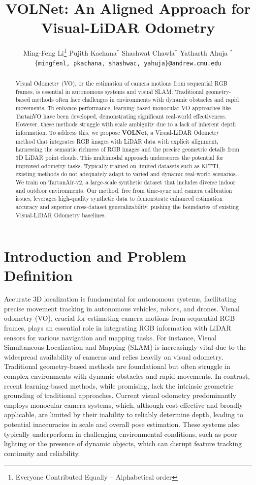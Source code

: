 \documentclass[11pt,a4paper]{article}
\title{VOLNet: An Aligned Approach for Visual-LiDAR Odometry}
\author{
  Ming-Feng Li\thanks{\hspace{4pt}Everyone Contributed Equally -- Alphabetical order} \hspace{2em} Pujith Kachana$^*$ \hspace{2em} Shashwat Chawla$^*$ \hspace{2em} Yatharth Ahuja $^*$ \\
  \texttt{\{mingfenl, pkachana, shashwac, yahuja\}@andrew.cmu.edu}
  }
\date{}
\begin{document}
\maketitle
\begin{abstract}
Visual Odometry (VO), or the estimation of camera motions from sequential RGB frames, is essential in autonomous systems and visual SLAM. Traditional geometry-based methods often face challenges in environments with dynamic obstacles and rapid movements. To enhance performance, learning-based monocular VO approaches like TartanVO have been developed, demonstrating significant real-world effectiveness. However, these methods struggle with scale ambiguity due to a lack of inherent depth information. To address this, we propose \textbf{VOLNet}, a Visual-LiDAR Odometry method that integrates RGB images with LiDAR data with explicit alignment, harnessing the semantic richness of RGB images and the precise geometric details from 3D LiDAR point clouds. This multimodal approach underscores the potential for improved odometry tasks. Typically trained on limited datasets such as KITTI, existing methods do not adequately adapt to varied and dynamic real-world scenarios. We train on TartanAir-v2, a large-scale synthetic dataset that includes diverse indoor and outdoor environments. Our method, free from time-sync and camera calibration issues, leverages high-quality synthetic data to demonstrate enhanced estimation accuracy and superior cross-dataset generalizability, pushing the boundaries of existing Visual-LiDAR Odometry baselines.

\end{abstract}

\section{Introduction and Problem Definition}
Accurate 3D localization is fundamental for autonomous systems, facilitating precise movement tracking in autonomous vehicles, robots, and drones. Visual odometry (VO), crucial for estimating camera motions from sequential RGB frames, plays an essential role in integrating RGB information with LiDAR sensors for various navigation and mapping tasks. For instance, Visual Simultaneous Localization and Mapping (SLAM) is increasingly vital due to the widespread availability of cameras and relies heavily on visual odometry.
Traditional geometry-based methods are foundational but often struggle in complex environments with dynamic obstacles and rapid movements. In contrast, recent learning-based methods, while promising, lack the intrinsic geometric grounding of traditional approaches.
Current visual odometry predominantly employs monocular camera systems, which, although cost-effective and broadly applicable, are limited by their inability to reliably determine depth, leading to potential inaccuracies in scale and overall pose estimation. These systems also typically underperform in challenging environmental conditions, such as poor lighting or the presence of dynamic objects, which can disrupt feature tracking continuity and reliability.
\end{document}
